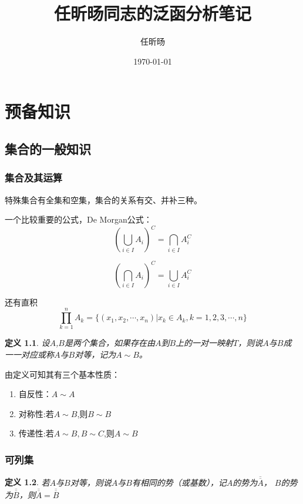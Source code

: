 \documentclass[UTF8]{ctexbook}
\title{任昕旸同志的泛函分析笔记}
\author{任昕旸}
\date{\today}
\newtheorem{definition}{定义}[chapter]
\begin{document}
\maketitle
\tableofcontents

\chapter{预备知识}
\section{集合的一般知识}
\subsection{集合及其运算}
特殊集合有全集和空集，集合的关系有交、并补三种。

一个比较重要的公式，De Morgan公式：
\begin{equation}
    (\bigcup_{i \in I} A_i)^C = \bigcap_{i \in I} A_i^C
\end{equation}

\begin{equation}
    (\bigcap_{i \in I} A_i)^C = \bigcup_{i \in I} A_i^C
\end{equation}

还有直积
\begin{equation}
    \prod_{k=1}^n A_k = \{ (x_1,x_2,\cdots,x_n)|x_k \in A_k,k=1,2,3,\cdots,n \}
\end{equation}

\begin{definition}
    设$A$,$B$是两个集合，如果存在由$A$到$B$上的一对一映射$T$，则说$A$与$B$成
    一一对应或称$A$与$B$对等，记为$A \sim B$。
\end{definition}

由定义可知其有三个基本性质：
\begin{enumerate}
    \item 自反性：$A \sim A$
    \item 对称性:若$A \sim B$,则$B \sim B$
    \item 传递性:若$A \sim B, B \sim C$,则$A \sim B$
\end{enumerate}

\subsection{可列集}
\begin{definition}
    若$A$与$B$对等，则说$A$与$B$有相同的势（或基数），记$A$的势为$\overline{\overline A}$，
    $B$的势为$\overline {\overline {B}}$，则$\overline{\overline {A}} = \overline{\overline {B}}$
\end{definition}
\end{document}
